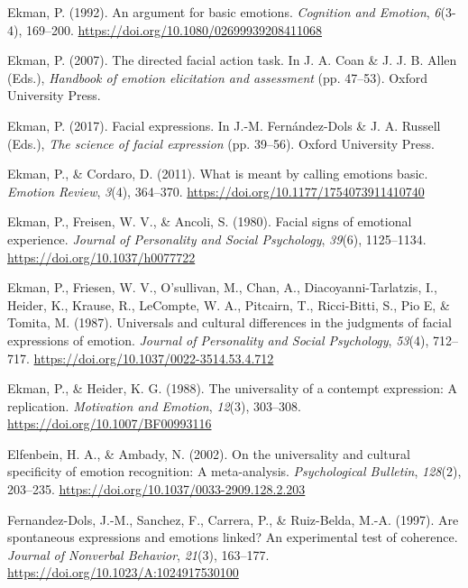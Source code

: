 \documentclass[
  english,
  doc]{apa7}
\newlength{\cslhangindent}
\newenvironment{cslreferences}%
  {\setlength{\parindent}{0pt}%
  \everypar{\setlength{\hangindent}{\cslhangindent}}\ignorespaces}%
  {\par}
\begin{document}
\begin{cslreferences}
\leavevmode\hypertarget{ref-ekman1992argument}{}%
Ekman, P. (1992). An argument for basic emotions. \emph{Cognition and Emotion}, \emph{6}(3-4), 169--200. \url{https://doi.org/10.1080/02699939208411068}

\leavevmode\hypertarget{ref-ekman2007directed}{}%
Ekman, P. (2007). The directed facial action task. In J. A. Coan \& J. J. B. Allen (Eds.), \emph{Handbook of emotion elicitation and assessment} (pp. 47--53). Oxford University Press.

\leavevmode\hypertarget{ref-ekman2017facial}{}%
Ekman, P. (2017). Facial expressions. In J.-M. Fernández-Dols \& J. A. Russell (Eds.), \emph{The science of facial expression} (pp. 39--56). Oxford University Press.

\leavevmode\hypertarget{ref-ekman2011meant}{}%
Ekman, P., \& Cordaro, D. (2011). What is meant by calling emotions basic. \emph{Emotion Review}, \emph{3}(4), 364--370. \url{https://doi.org/10.1177/1754073911410740}

\leavevmode\hypertarget{ref-ekman1980facial}{}%
Ekman, P., Freisen, W. V., \& Ancoli, S. (1980). Facial signs of emotional experience. \emph{Journal of Personality and Social Psychology}, \emph{39}(6), 1125--1134. \url{https://doi.org/10.1037/h0077722}

\leavevmode\hypertarget{ref-ekman1987universals}{}%
Ekman, P., Friesen, W. V., O'sullivan, M., Chan, A., Diacoyanni-Tarlatzis, I., Heider, K., Krause, R., LeCompte, W. A., Pitcairn, T., Ricci-Bitti, S., Pio E, \& Tomita, M. (1987). Universals and cultural differences in the judgments of facial expressions of emotion. \emph{Journal of Personality and Social Psychology}, \emph{53}(4), 712--717. \url{https://doi.org/10.1037/0022-3514.53.4.712}

\leavevmode\hypertarget{ref-ekman1988universality}{}%
Ekman, P., \& Heider, K. G. (1988). The universality of a contempt expression: A replication. \emph{Motivation and Emotion}, \emph{12}(3), 303--308. \url{https://doi.org/10.1007/BF00993116}

\leavevmode\hypertarget{ref-elfenbein2002universality}{}%
Elfenbein, H. A., \& Ambady, N. (2002). On the universality and cultural specificity of emotion recognition: A meta-analysis. \emph{Psychological Bulletin}, \emph{128}(2), 203--235. \url{https://doi.org/10.1037/0033-2909.128.2.203}

\leavevmode\hypertarget{ref-fernandez1997spontaneous}{}%
Fernandez-Dols, J.-M., Sanchez, F., Carrera, P., \& Ruiz-Belda, M.-A. (1997). Are spontaneous expressions and emotions linked? An experimental test of coherence. \emph{Journal of Nonverbal Behavior}, \emph{21}(3), 163--177. \url{https://doi.org/10.1023/A:1024917530100}


\end{cslreferences}
\end{document}
